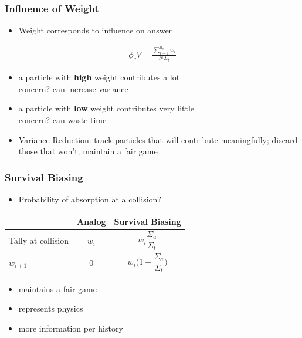 \documentclass[xcolor=x11names,compress]{beamer}
\renewcommand{\(}{\begin{columns}}
\renewcommand{\)}{\end{columns}}
\newcommand{\<}[1]{\begin{column}{#1}}
\renewcommand{\>}{\end{column}}
\begin{document}
\begin{frame}[fragile]
  \frametitle{Influence of Weight}
  \begin{itemize}
  	\item Weight corresponds to influence on answer
  \end{itemize}
  \begin{align}
  \phi_c V = \frac{\sum_{i=1}^{n_c} w_{i} }{N \Sigma_t} \nonumber 
  \end{align}
  \begin{itemize}
  	\item a particle with \textbf{high} weight contributes a lot
  	\\ \underline{concern?} can increase variance
  	\item a particle with \textbf{low} weight contributes very little
  	\\ \underline{concern?} can waste time  	
  	\item Variance Reduction: track particles that will contribute meaningfully; discard those that won't; maintain a fair game
  \end{itemize}

\end{frame}


\begin{frame}[fragile]
  \frametitle{Survival Biasing}
  \begin{itemize}
  	\item Probability of absorption at a collision?
  \end{itemize}

\begin{tabu}{|X | c |X|}
\hline
 & Analog &  Survival Biasing \\\hline
Tally at collision & $w_i$ &  \[w_i \frac{\Sigma_a}{\Sigma_t}\]  \\
$w_{i+1}$ & $0$ & \[w_i\bigl(1-\frac{\Sigma_a}{\Sigma_t} \bigr)\] \\\hline
\end{tabu}

  \begin{itemize}
  	\item maintains a fair game
  	\item represents physics
  	\item more information per history
  \end{itemize}

\end{frame}
\end{document}
